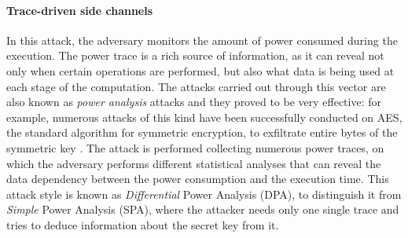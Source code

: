 \documentclass[12pt,a4paper]{book}
\theoremstyle{definition}
\begin{document}
	\paragraph{Trace-driven side channels} In this attack, the adversary monitors the amount of power consumed during the execution. The power trace is a rich source of information, as it can reveal not only when certain operations are performed, but also what data is being used at each stage of the computation. The attacks carried out through this vector are also known as \textit{power analysis} attacks and they proved to be very effective: for example, numerous attacks of this kind have been successfully conducted on AES, the standard algorithm for symmetric encryption, to exfiltrate entire bytes of the symmetric key \cite{Buchanan2017} \cite{Mangard2003} \cite{Mangard2010} \cite{Oswald2004}. The attack is performed collecting numerous power traces, on which the adversary performs different statistical analyses that can reveal the data dependency between the power consumption and the execution time. This attack style is known as \textit{Differential} Power Analysis (DPA), to distinguish it from \textit{Simple} Power Analysis (SPA), where the attacker needs only one single trace and tries to deduce information about the secret key from it.
\end{document}
